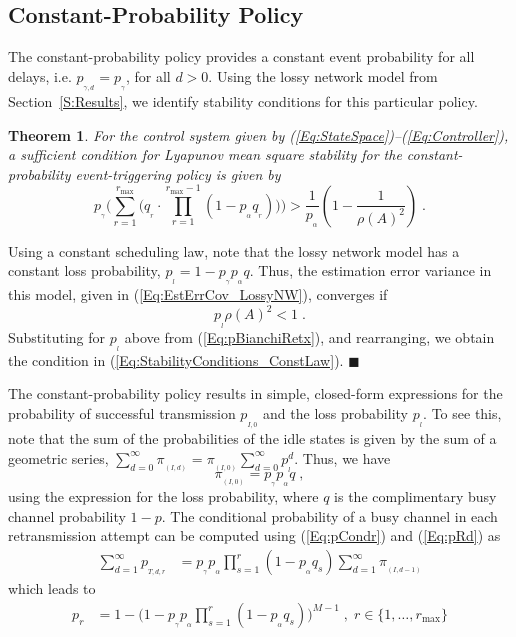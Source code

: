 \documentclass[twocolumn]{autart}
\newtheorem{theorem}{Theorem}[section]
\newenvironment{proof}[1][Proof]{\begin{trivlist}
\item[\hskip \labelsep {\bfseries #1}]}{\end{trivlist}}
\renewcommand{\qed}{$\blacksquare$}
\begin{document}
\subsection{Constant-Probability Policy}
The constant-probability policy provides a constant event probability for all delays, i.e. $p_{_{\gamma,d}} = p_{_{\gamma}}$, for all $d>0$. Using the lossy network model from Section~\ref{S:Results}, we identify stability conditions for this particular policy.

\begin{theorem} \label{Thm:ConstLaw}
For the control system given by (\ref{Eq:StateSpace})--(\ref{Eq:Controller}), a sufficient condition for Lyapunov mean square stability for the constant-probability event-triggering policy is given by
\begin{equation} \label{Eq:StabilityConditions_ConstLaw}
p_{_{\gamma}} \bigg( \sum_{r=1}^{r_{\max}} \big ( q_{_{r}} \cdot \prod_{r=1}^{r_{\max}-1} (1-p_{_{\alpha}} q_{_{r}})\big) \bigg) > \frac{1}{p_{_{\alpha}}} (1-\frac{1}{\rho(A)^2}) \; .
\end{equation}
\end{theorem}
\begin{proof}
Using a constant scheduling law, note that the lossy network model has a constant loss probability, $p_{_{l}} = 1-p_{_{\gamma}} p_{_{\alpha}} q$. Thus, the estimation error variance in this model, given in (\ref{Eq:EstErrCov_LossyNW}), converges if
\begin{equation*}
p_{_{l}} \rho(A)^2 < 1 \; .
\end{equation*}
Substituting for $p_{_{l}}$ above from (\ref{Eq:pBianchiRetx}), and rearranging, we obtain the condition in (\ref{Eq:StabilityConditions_ConstLaw}). \hfill \qed
\end{proof}

The constant-probability policy results in simple, closed-form expressions for the probability of successful transmission $p_{_{I,0}}$ and the loss probability $p_{_{l}}$. To see this, note that the sum of the probabilities of the idle states is given by the sum of a geometric series, $\sum_{d=0}^\infty \pi_{_{(I,d)}} = \pi_{_{(I,0)}} \sum_{d=0}^\infty p_{_{l}}^d$. Thus, we have
\begin{equation} \label{Eq:pI0_ConstLaw}
\pi_{_{(I,0)}} = p_{_{\gamma}} p_{_{\alpha}} q \; ,
\end{equation}
using the expression for the loss probability, where $q$ is the complimentary busy channel probability $1-p$. The conditional probability of a busy channel in each retransmission attempt can be computed using (\ref{Eq:pCondr}) and (\ref{Eq:pRd}) as
\begin{align*}
\sum_{d=1}^\infty p_{_{T,d,r}} &= p_{_{\gamma}} p_{_{\alpha}} \prod_{s=1}^r (1 - p_{_{\alpha}} q_s) \sum_{d=1}^\infty \pi_{_{(I,d-1)}}
\end{align*}
which leads to
\begin{align}
p_r &= 1 - \bigg( 1 - p_{_{\gamma}} p_{_{\alpha}} \prod_{s=1}^r (1 - p_{_{\alpha}} q_s) \bigg)^{M-1} \; , \; r \in \{1,\dots,r_{\max}\} \label{Eq:pr_ConstLaw}
\end{align}
\end{document}
